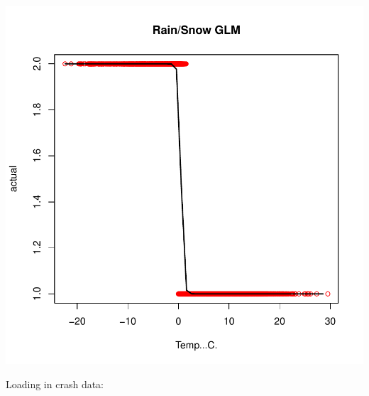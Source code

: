 \documentclass[11pt, a4paper]{article}
\begin{document}
\includegraphics{datacleaning-chunk4glm}






\pagebreak

Loading in crash data:
\end{document}
